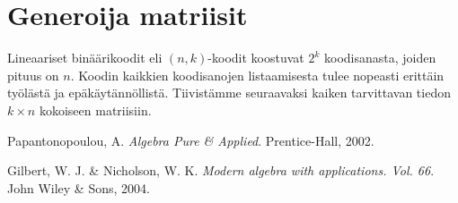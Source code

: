 \documentclass[a4paper,12pt,leqno,oneside]{report} %
\theoremstyle{plain}
\theoremstyle{definition}
\theoremstyle{remark}
\numberwithin{equation}{chapter}
\begin{document}
    \chapter{Generoija matriisit}
    Lineaariset binäärikoodit eli $(n,k)$-koodit koostuvat $2^k$ koodisanasta, joiden pituus on $n$. Koodin kaikkien koodisanojen listaamisesta tulee nopeasti erittäin työlästä ja epäkäytännöllistä. Tiivistämme seuraavaksi kaiken tarvittavan tiedon $k \times n$ kokoiseen matriisiin.

    \begin{thebibliography}{9}


        Papantonopoulou, A.
        \emph{Algebra Pure \& Applied}.
        Prentice-Hall, 2002.

        Gilbert, W. J. \& Nicholson, W. K.
        \emph{Modern algebra with applications. Vol. 66}.
        John Wiley \& Sons, 2004.

\end{thebibliography}
\end{document}
